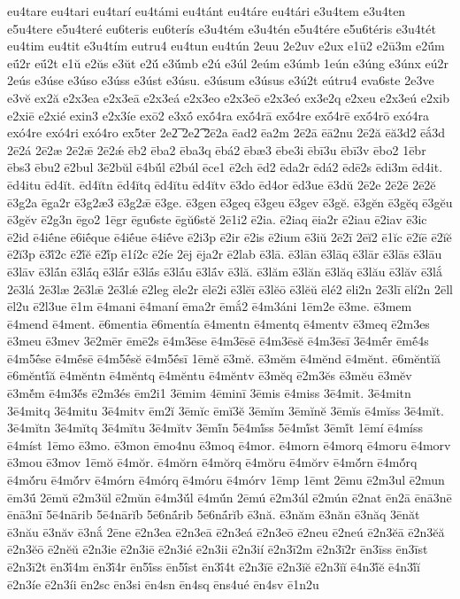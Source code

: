 {eu4tare
eu4tari
eu4tarí
eu4támi
eu4tánt
eu4táre
eu4tári
e3u4tem
e3u4ten
e5u4tere
e5u4teré
eu6teris
eu6terís
e3u4tém
e3u4tén
e5u4tére
e5u6téris
e3u4tét
eu4tim
eu4tit
e3u4tím
eutru4
eu4tun
eu4tún
2euu
2e2uv
e2ux
e1ū2
e2ū3m
e2ū́m
eū́2r
eū́2t
e1ŭ
e2ŭs
e3ŭt
e2ŭ́
e3ŭ́mb
e2ú
e3úl
2eúm
e3úmb
1eún
e3úng
e3únx
eú2r
2eús
e3úse
e3úso
e3úss
e3úst
e3úsu.
e3úsum
e3úsus
e3ú2t
eútru4
eva6ste
2e3ve
e3vĕ
ex2ă
e2x3ea
e2x3eā
e2x3eá
e2x3eo
e2x3eō
e2x3eó
ex3e2q
e2xeu
e2x3eú
e2xib
e2xiē
e2xié
exin3
e2x3íe
exō2
e3xṓ
exṓ4ra
exṓ4rā
exṓ4re
exṓ4rē
exṓ4rō
exó4ra
exó4re
exó4ri
exó4ro
ex5ter
2e2͞
2e2͡
2ē2a
ēad2
ēa2m
2ē2ā
ēā2nu
2ē2ă
ēă3d2
ēắ3d
2ē2á
2ē2æ
2ē2ǣ
2ē2ǽ
ēb2
ēba2
ēba3q
ēbá2
ēbæ3
ēbe3i
ēbī3u
ēbī3v
ēbo2
1ēbr
ēbs3
ēbu2
ē2bul
3ē2bŭl
ē4bŭ́l
ē2búl
ēce1
ē2ch
ēd2
ēda2r
ēdá2
ēdē2s
ēdi3m
ēd4it.
ēd4itu
ēd4ĭt.
ēd4ĭtn
ēd4ĭtq
ēd4ĭtu
ēd4ĭtv
ē3do
ēd4or
ēd3ue
ē3dŭ
2ē2e
2ē2ē
2ē2ĕ
ē3g2a
ēga2r
ē3g2æ3
ē3g2ǣ
ē3ge.
ē3gen
ē3geq
ē3geu
ē3gev
ē3gĕ.
ē3gĕn
ē3gĕq
ē3gĕu
ē3gĕv
ē2g3n
ēgo2
1ēgr
ēgu6ste
ēgŭ6stĕ
2ē1i2
ē2ia.
ē2iaq
ēia2r
ē2iau
ē2iav
ē3ic
ē2id
ē4iḗne
ē6iḗque
ē4iḗue
ē4iḗve
ē2i3p
ē2ir
ē2is
ē2ium
ē3iŭ
2ē2ī
2ēĭ2
ē1ĭc
ē2ĭē
ē2ĭĕ
ē2ĭ3p
ē3ĭ́2c
ē2ĭ́ĕ
ē2ĭ́p
ē1í2c
ē2íe
2ēj
ēja2r
ē2lab
ē3lā.
ē3lān
ē3lāq
ē3lār
ē3lās
ē3lāu
ē3lāv
ē3lā́n
ē3lā́q
ē3lā́r
ē3lā́s
ē3lā́u
ē3lā́v
ē3lă.
ē3lăm
ē3lăn
ē3lăq
ē3lău
ē3lăv
ē3lắ
2ē3lá
2ē3læ
2ē3lǣ
2ē3lǽ
ē2leg
ēle2r
ēlē2i
ē3lĕī
ē3lĕō
ē3lĕŭ
ēlé2
ēli2n
2ē3lī
ēlí2n
2ēll
ēl2u
ē2l3ue
ē1m
ē4mani
ē4maní
ēma2r
ēmắ2
ē4m3áni
1ēm2e
ē3me.
ē3mem
ē4mend
ē4ment.
ē6mentia
ē6mentía
ē4mentn
ē4mentq
ē4mentv
ē3meq
ē2m3es
ē3meu
ē3mev
3ē2mēr
ēmē2s
ē4m3ēse
ē4m3ēsē
ē4m3ēsĕ
ē4m3ēsī
3ē4mḗr
ēmḗ4s
ē4m5ḗse
ē4mḗsē
ē4m5ḗsĕ
ē4m5ḗsī
1ēmĕ
ē3mĕ.
ē3mĕm
ē4mĕnd
ē4mĕnt.
ē6mĕntĭă
ē6mĕntĭ́ă
ē4mĕntn
ē4mĕntq
ē4mĕntu
ē4mĕntv
ē3mĕq
ē2m3ĕs
ē3mĕu
ē3mĕv
ē3mĕ́m
ē4m3ĕ́s
ē2m3és
ēm2i1
3ēmim
4ēminī
3ēmis
ē4miss
3ē4mit.
3ē4mitn
3ē4mitq
3ē4mitu
3ē4mitv
ēm2ĭ
3ēmĭc
ēmĭ3ĕ
3ēmĭm
3ēmĭnĕ
3ēmĭs
ē4mĭss
3ē4mĭt.
3ē4mĭtn
3ē4mĭtq
3ē4mĭtu
3ē4mĭtv
3ēmĭ́n
5ē4mĭ́ss
5ē4mĭ́st
3ēmĭ́t
1ēmí
ē4míss
ē4míst
1ēmo
ē3mo.
ē3mon
ēmo4nu
ē3moq
ē4mor.
ē4morn
ē4morq
ē4moru
ē4morv
ē3mou
ē3mov
1ēmŏ
ē4mŏr.
ē4mŏrn
ē4mŏrq
ē4mŏru
ē4mŏrv
ē4mŏ́rn
ē4mŏ́rq
ē4mŏ́ru
ē4mŏ́rv
ē4mórn
ē4mórq
ē4móru
ē4mórv
1ēmp
1ēmt
2ēmu
ē2m3ul
ē2mun
ēm3ū́
2ēmŭ
ē2m3ŭl
ē2mŭn
ē4m3ŭ́l
ē4mŭ́n
2ēmú
ē2m3úl
ē2mún
ē2nat
ēn2ā
ēnā3nē
ēnā3nī
5ē4nārib
5ē4nārĭb
5ē6nā́rib
5ē6nā́rĭb
ē3nă.
ē3năm
ē3năn
ē3năq
3ēnăt
ē3nău
ē3năv
ē3nắ
2ēne
ē2n3ea
ē2n3eā
ē2n3eá
ē2n3eō
ē2neu
ē2neú
ē2n3ĕā
ē2n3ĕă
ē2n3ĕō
ē2nĕŭ
ē2n3ie
ē2n3iē
ē2n3ié
ē2n3ii
ē2n3ií
ē2n3ī2m
ē2n3ī2r
ēn3īss
ēn3īst
ē2n3ī2t
ēn3ī́4m
ēn3ī́4r
ēn5ī́ss
ēn5ī́st
ēn3ī́4t
ē2n3ĭē
ē2n3ĭĕ
ē2n3ĭĭ
ē4n3ĭ́ĕ
ē4n3ĭ́ĭ
ē2n3íe
ē2n3íi
ēn2sc
ēn3si
ēn4sn
ēn4sq
ēns4ué
ēn4sv
ē1n2u
}

